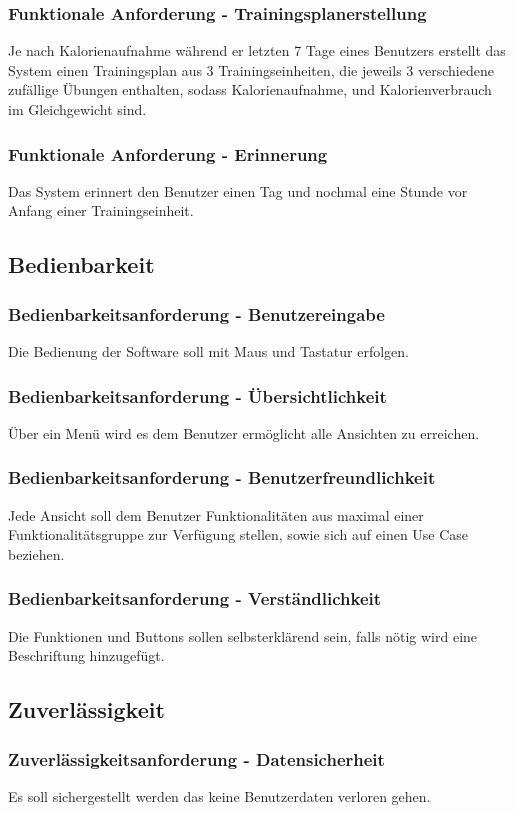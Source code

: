 \documentclass[12pt,a4paper,onecolumn]{article}
\begin{document}
\subsubsection{Funktionale Anforderung - Trainingsplanerstellung}
Je nach Kalorienaufnahme während er letzten 7 Tage eines Benutzers erstellt das System einen \gls{Trainingsplan} aus 3 Trainingseinheiten, die jeweils 3 verschiedene zufällige \gls{Übung}en enthalten, sodass Kalorienaufnahme, und Kalorienverbrauch im Gleichgewicht sind.
\subsubsection{Funktionale Anforderung - Erinnerung}
Das System erinnert den Benutzer einen Tag und nochmal eine Stunde vor Anfang einer \gls{Trainingseinheit}.

\subsection{Bedienbarkeit}
\subsubsection{Bedienbarkeitsanforderung - Benutzereingabe}
Die Bedienung der Software soll mit Maus und Tastatur erfolgen.
\subsubsection{Bedienbarkeitsanforderung - Übersichtlichkeit}
Über ein Menü wird es dem Benutzer ermöglicht alle Ansichten zu erreichen.
\subsubsection{Bedienbarkeitsanforderung - Benutzerfreundlichkeit}
Jede Ansicht soll dem Benutzer Funktionalitäten aus maximal einer Funktionalitätsgruppe zur Verfügung stellen, sowie sich auf einen Use Case beziehen.
\subsubsection{Bedienbarkeitsanforderung - Verständlichkeit}
Die Funktionen und Buttons sollen selbsterklärend sein, falls nötig wird eine Beschriftung hinzugefügt.

\subsection{Zuverlässigkeit}
\subsubsection{Zuverlässigkeitsanforderung - Datensicherheit}
Es soll sichergestellt werden das keine Benutzerdaten verloren gehen.
\end{document}
